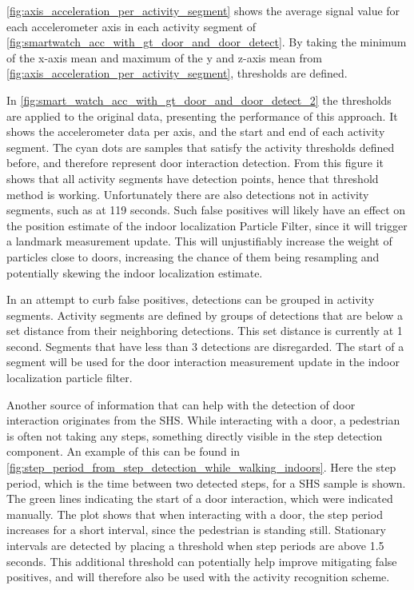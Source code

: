 \cref{fig:axis_acceleration_per_activity_segment} shows the average signal value for each accelerometer axis in each activity segment of \cref{fig:smartwatch_acc_with_gt_door_and_door_detect}. By taking the minimum of the x-axis mean and maximum of the y and z-axis mean from \cref{fig:axis_acceleration_per_activity_segment}, thresholds are defined.

In \cref{fig:smart_watch_acc_with_gt_door_and_door_detect_2} the thresholds are applied to the original data, presenting the performance of this approach. It shows the accelerometer data per axis, and the start and end of each activity segment. The cyan dots are samples that satisfy the activity thresholds defined before, and therefore represent door interaction detection. From this figure it shows that all activity segments have detection points, hence that threshold method is working. Unfortunately there are also detections not in activity segments, such as at 119 seconds. Such false positives will likely have an effect on the position estimate of the indoor localization Particle Filter, since it will trigger a landmark measurement update. This will unjustifiably increase the weight of particles close to doors, increasing the chance of them being resampling and potentially skewing the indoor localization estimate.  \par 

In an attempt to curb false positives, detections can be grouped in activity segments. Activity segments are defined by groups of detections that are below a set distance from their neighboring detections. This set distance is currently at 1 second. Segments that have less than 3 detections are disregarded. The start of a segment will be used for the door interaction measurement update in the indoor localization particle filter.\par

Another source of information that can help with the detection of door interaction originates from the \ac{SHS}. While interacting with a door, a pedestrian is often not taking any steps, something directly visible in the step detection component. An example of this can be found in \cref{fig:step_period_from_step_detection_while_walking_indoors}. Here the step period, which is the time between two detected steps, for a \ac{SHS} sample is shown. The green lines indicating the start of a door interaction, which were indicated manually. The plot shows that when interacting with a door, the step period increases for a short interval, since the pedestrian is standing still. Stationary intervals are detected by placing a threshold when step periods are above 1.5 seconds. This additional threshold can potentially help improve mitigating false positives, and will therefore also be used with the activity recognition scheme.

